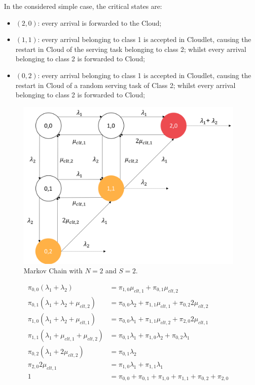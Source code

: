 In the considered simple case, the critical states are:

\begin{itemize}
	\item $(2,0)$: every arrival is forwarded to the Cloud;
	
	\item $(1,1)$: every arrival belonging to class 1 is accepted in Cloudlet, causing the restart in Cloud of the serving task belonging to class 2; whilst every arrival belonging to class 2 is forwarded to Cloud;
	
	\item $(0,2)$: every arrival belonging to class 1 is accepted in Cloudlet, causing the restart in Cloud of a random serving task of Class 2; whilst every arrival belonging to class 2 is forwarded to Cloud;
\end{itemize}

\begin{figure}
	\includegraphics[width=\columnwidth]{fig/analytical-model-markov}
	\caption{Markov Chain with $N=2$ and $S=2$.}
	\label{fig:analytical-model-markov}
\end{figure}

\begin{equation} 
\begin{split}
\pi_{0,0}(\lambda_{1}+\lambda_{2})& = \pi_{1,0}\mu_{clt,1}+\pi_{0,1}\mu_{clt,2} \\
\pi_{0,1}(\lambda_{1}+\lambda_{2}+\mu_{clt,2}) & = \pi_{0,0}\lambda_{2}+\pi_{1,1}\mu_{clt,1}+\pi_{0,2}2\mu_{clt,2} \\
\pi_{1,0}(\lambda_{1}+\lambda_{2}+\mu_{clt,1}) & = \pi_{0,0}\lambda_{1}+\pi_{1,1}\mu_{clt,2}+\pi_{2,0}2\mu_{clt,1} \\
\pi_{1,1}(\lambda_{1}+\mu_{clt,1}+\mu_{clt,2}) & = \pi_{0,1}\lambda_{1}+\pi_{1,0}\lambda_{2}+\pi_{0,2}\lambda_{1} \\
\pi_{0,2}(\lambda_{1}+2\mu_{clt,2}) & = \pi_{0,1}\lambda_{2} \\
\pi_{2,0}2\mu_{clt,1} & = \pi_{1,0}\lambda_{1}+\pi_{1,1}\lambda_{1} \\
1 & = \pi_{0,0}+\pi_{0,1}+\pi_{1,0}+\pi_{1,1}+\pi_{0,2}+\pi_{2,0}\\
\end{split}
\label{eqn:analytical-model-markov}
\end{equation}

